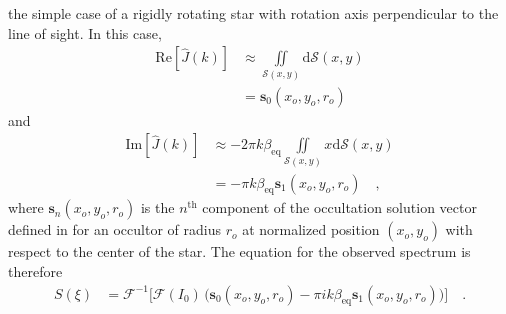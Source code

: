 \documentclass[modern]{aastex62}
\begin{document}
the simple case of a rigidly rotating star with rotation axis
perpendicular to the line of sight. In this case,
%
\begin{align}
    \mathrm{Re}\left[\hat{J}(k)\right] 
    &\approx \iint\limits_{\mathcal{S}(x, y)}\mathrm{d}\mathcal{S}(x, y)
    \nonumber \\
    &= \mathbf{s}_0(x_o, y_o, r_o)
\end{align}
%
and
%
\begin{align}
    \mathrm{Im}\left[\hat{J}(k)\right] 
    &\approx 
    -2\pi k \beta_\mathrm{eq}
    \iint\limits_{\mathcal{S}(x, y)}
    x
    \mathrm{d}\mathcal{S}(x, y)
    \nonumber \\
    &= -\pi k \beta_\mathrm{eq} \mathbf{s}_1(x_o, y_o, r_o)
    \quad,
\end{align}
%
where $\mathbf{s}_n(x_o, y_o, r_o)$ is the $n^\mathrm{th}$ component of the 
occultation solution vector defined in \citet{Luger2019} for an occultor
of radius $r_o$
at normalized position $(x_o, y_o)$ with respect to the center of the star.
%
The equation for the observed spectrum is therefore
%
\begin{align}
    \label{eq:uniform}
    S(\xi) &= 
    \mathcal{F}^{-1}
    \Big[
        \mathcal{F}(I_0)
        \,
        \Big(
            \mathbf{s}_0(x_o, y_o, r_o)
            -
            \pi i k \beta_\mathrm{eq} \mathbf{s}_1(x_o, y_o, r_o)
        \Big)
    \Big]
    \quad.
\end{align}
%




\end{document}
